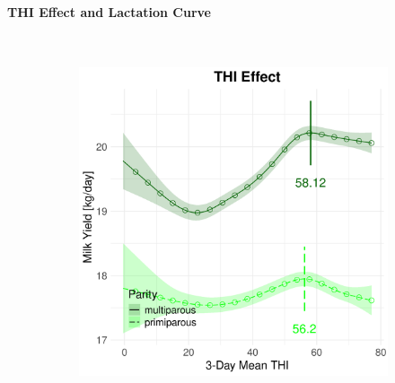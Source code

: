 \newpage
\paragraph{THI Effect and Lactation Curve} \quad \\
\begin{figure}[H]
    \centering
    \begin{subfigure}[b]{0.45\textwidth}
        \centering
        \includegraphics[width=\textwidth]{thesis/figures/models/milk/full/je_milk_full/je_milk_full_marginal_thi_milk_combined.png}
    \end{subfigure}
    \hspace{0.05\textwidth} %
    \begin{subfigure}[b]{0.45\textwidth}
        \centering

\end{subfigure}
\end{figure}
